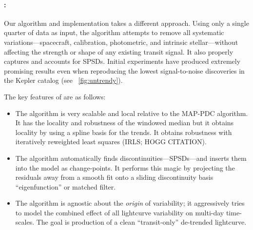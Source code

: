 \documentclass[letterpaper,12pt,preprint]{hack_aastex}
\newcommand{\Untrendy}{\package{Untrendy}}
\begin{document}
\paragraph{\Untrendy:}
Our algorithm and implementation takes a
different approach.
Using only a single quarter of data as input, the algorithm attempts to
remove all systematic variations---spacecraft, calibration, photometric, and
intrinsic stellar---without affecting the strength or shape of any existing
transit signal.
It also properly captures and accounts for SPSDs.
Initial experiments have produced extremely promising results even when
reproducing the lowest signal-to-noise discoveries in the Kepler catalog
(see \figurename~\ref{fig:untrendy}).

The key features of \Untrendy are as follows:
\begin{itemize}
\item The algorithm is very scalable and local relative to the MAP-PDC
  algorithm.  It has the locality and robustness of the 
  windowed median but
  it obtains locality by using a spline basis for the trends.  It obtains
  robustness with iteratively reweighted least squares (IRLS; HOGG CITATION).
\item The algorithm automatically finds discontinuities---SPSDs---and inserts
  them into the model as change-points.
  It performs this magic by projecting the residuals away from a smooth fit
  onto a sliding discontinuity basis ``eigenfunction'' or matched filter.
\item The algorithm is agnostic about the \emph{origin} of variability; it
  aggressively tries to model the combined effect of all lightcurve variability
  on multi-day time-scales.
  The goal is production of a clean ``transit-only'' de-trended lightcurve.
\end{itemize}
\end{document}
